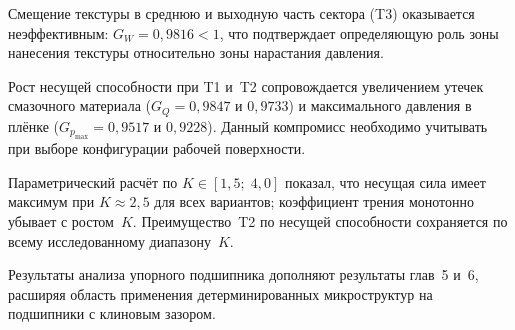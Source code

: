 Смещение текстуры в среднюю и выходную часть сектора (T3)
оказывается неэффективным: $G_W = 0{,}9816 < 1$, что подтверждает
определяющую роль зоны нанесения текстуры относительно зоны
нарастания давления.

Рост несущей способности при T1 и~T2 сопровождается увеличением
утечек смазочного материала ($G_Q = 0{,}9847$ и $0{,}9733$)
и максимального давления в плёнке ($G_{p_{\max}} = 0{,}9517$
и $0{,}9228$). Данный компромисс необходимо учитывать при выборе
конфигурации рабочей поверхности.

Параметрический расчёт по
$K \in [1{,}5;\; 4{,}0]$ показал, что несущая сила имеет максимум
при $K \approx 2{,}5$ для всех вариантов; коэффициент трения
монотонно убывает с ростом~$K$. Преимущество~T2 по несущей
способности сохраняется по всему исследованному диапазону~$K$.

Результаты анализа упорного подшипника дополняют результаты
глав~5 и~6, расширяя область применения детерминированных
микроструктур на подшипники с клиновым зазором.
